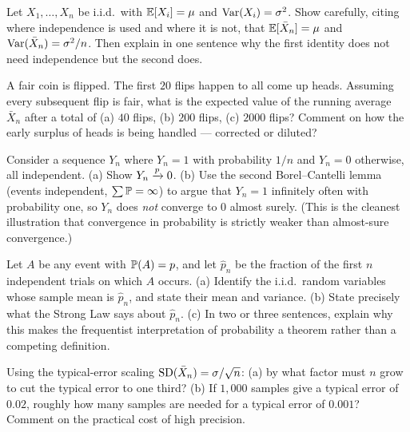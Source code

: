 \begin{exercise}
Let $X_1,\dots,X_n$ be i.i.d.\ with $\E[X_i]=\mu$ and $\Var(X_i)=\sigma^2$. Show carefully, citing where independence is used and where it is not, that $\E[\bar X_n]=\mu$ and $\Var(\bar X_n)=\sigma^2/n$. Then explain in one sentence why the first identity does not need independence but the second does.
\end{exercise}

\begin{exercise}
A fair coin is flipped. The first $20$ flips happen to all come up heads. Assuming every subsequent flip is fair, what is the expected value of the running average $\bar X_n$ after a total of (a) $40$ flips, (b) $200$ flips, (c) $2000$ flips? Comment on how the early surplus of heads is being handled --- corrected or diluted?
\end{exercise}

\begin{exercise}
Consider a sequence $Y_n$ where $Y_n = 1$ with probability $1/n$ and $Y_n=0$ otherwise, all independent. (a) Show $Y_n \pto 0$. (b) Use the second Borel--Cantelli lemma (events independent, $\sum \P=\infty$) to argue that $Y_n=1$ infinitely often with probability one, so $Y_n$ does \emph{not} converge to $0$ almost surely. (This is the cleanest illustration that convergence in probability is strictly weaker than almost-sure convergence.)
\end{exercise}

\begin{exercise}
Let $A$ be any event with $\P(A)=p$, and let $\hat p_n$ be the fraction of the first $n$ independent trials on which $A$ occurs. (a) Identify the i.i.d.\ random variables whose sample mean is $\hat p_n$, and state their mean and variance. (b) State precisely what the Strong Law says about $\hat p_n$. (c) In two or three sentences, explain why this makes the frequentist interpretation of probability a theorem rather than a competing definition.
\end{exercise}

\begin{exercise}
Using the typical-error scaling $\SD(\bar X_n)=\sigma/\sqrt n$: (a) by what factor must $n$ grow to cut the typical error to one third? (b) If $1{,}000$ samples give a typical error of $0.02$, roughly how many samples are needed for a typical error of $0.001$? Comment on the practical cost of high precision.
\end{exercise}


